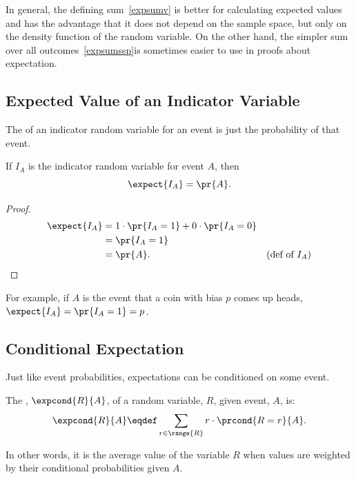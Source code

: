 In general, the defining sum~\eqref{expsumv} is better for calculating
expected values and has the advantage that it does not depend on the
sample space, but only on the density function of the random variable.  On
the other hand, the simpler sum over all outcomes~\eqref{expsumssp}is
sometimes easier to use in proofs about expectation.

\subsection{Expected Value of an Indicator Variable}

The  of an  indicator random
variable for an event is just the probability of that event.  

\begin{lemma}\label{expindic}
If $I_A$ is the indicator random variable for event $A$, then
\[
\expect{I_A} = \pr{A}.
\]
\end{lemma}

\begin{proof}
\begin{align*}
\expect{I_A} 
& =  1 \cdot \pr{I_A = 1} + 0 \cdot \pr{I_A = 0} \\
& = \pr{I_A = 1} \\
& =  \pr{A}. & \text{(def of $I_A$)}
\end{align*}
\end{proof}
For example, if $A$ is the event that a coin
with bias $p$ comes up heads, $\expect{I_A} = \pr{I_A=1} = p$.

\subsection{Conditional Expectation}

Just like event probabilities, expectations can be conditioned on some
event.
\begin{definition}\label{condexpdef} %
The , $\expcond{R}{A}$, of a random
variable, $R$, given event, $A$, is:
\begin{equation}\label{condexpsumv}
\expcond{R}{A} \eqdef \sum_{r \in \range{R}} r \cdot\prcond{R=r}{A}.
\end{equation}
\end{definition}
In other words, it is the average value of the variable $R$ when values
are weighted by their conditional probabilities given $A$.

